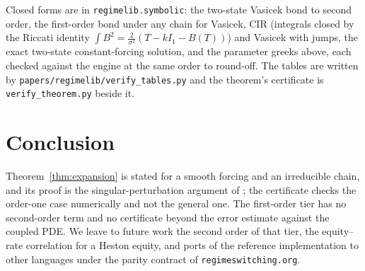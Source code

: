\documentclass[11pt]{article}
\theoremstyle{remark}
\begin{document}
Closed forms are in \texttt{regimelib.symbolic}: the two-state Vasicek bond to second order, the first-order
bond under any chain for Vasicek, CIR (integrals closed by the Riccati identity $\int B^2 = \frac2{\sigma^2}(T - kI_1 - B(T))$)
and Vasicek with jumps, the exact two-state constant-forcing solution, and the parameter greeks above, each
checked against the engine at the same order to round-off. The tables are written by
\texttt{papers/regimelib/verify\_tables.py} and the theorem's certificate is \texttt{verify\_theorem.py} beside it.

\section{Conclusion}

Theorem~\ref{thm:expansion} is stated for a smooth forcing and an irreducible chain, and its proof is the
singular-perturbation argument of \citet{yin2013}; the certificate checks the order-one case
numerically and not the general one. The first-order tier has no second-order term and no certificate beyond the
error estimate against the coupled PDE. We leave to future work the second order of that tier, the equity--rate
correlation for a Heston equity, and ports of the reference implementation to other languages under the parity
contract of \texttt{regimeswitching.org}.



\end{document}
